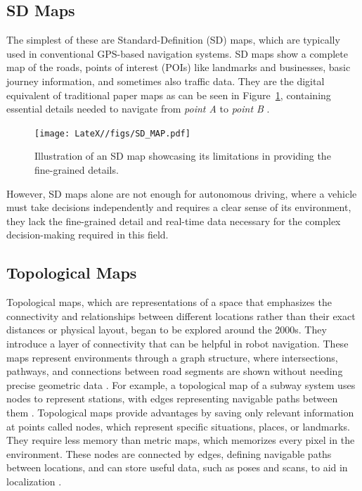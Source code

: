 \subsection{SD Maps}
The simplest of these are Standard-Definition (SD) maps, which are typically used in conventional GPS-based navigation systems. SD maps show a complete map of the roads, points of interest (POIs) like landmarks and businesses, basic journey information, and sometimes also traffic data. They are the digital equivalent of traditional paper maps as can be seen in Figure~\ref{fig:sd_map}, containing essential details needed to navigate from \textit{point A} to \textit{point B} \cite{Mudduluru_SD_vs_HD_Maps, Chiang2021}.
\begin{figure}[H]
    \centering
    \texttt{[image: LateX//figs/SD\_MAP.pdf]}
    \caption{Illustration of an SD map showcasing its limitations in providing the fine-grained details.}
    \label{fig:sd_map}
\end{figure}
However, SD maps alone are not enough for autonomous driving, where a vehicle must take decisions independently and requires a clear sense of its environment, they lack the fine-grained detail and real-time data necessary for the complex decision-making required in this field.

\subsection{Topological Maps}
Topological maps, which are representations of a space that emphasizes the connectivity and relationships between different locations rather than their exact distances or physical layout, began to be explored around the 2000s. They introduce a layer of connectivity that can be helpful in robot navigation. These maps represent environments through a graph structure, where intersections, pathways, and connections between road segments are shown without needing precise geometric data \cite{li2020survey}. For example, a topological map of a subway system uses nodes to represent stations, with edges representing navigable paths between them \cite{8105770}.
Topological maps provide advantages by saving only relevant information at points called nodes, which represent specific situations, places, or landmarks. They require less memory than metric maps, which memorizes every pixel in the environment. These nodes are connected by edges, defining navigable paths between locations, and can store useful data, such as poses and scans, to aid in localization \cite{murciego2021topological}.

